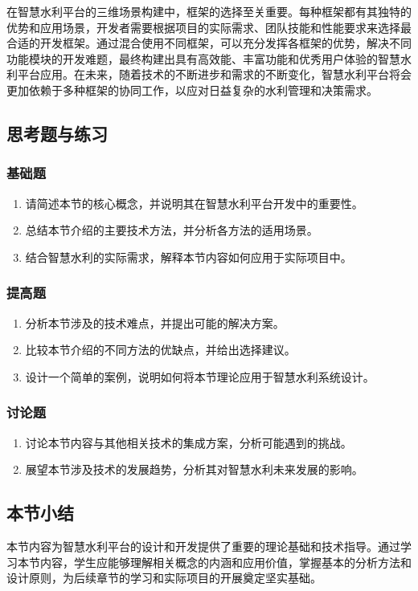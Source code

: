 在智慧水利平台的三维场景构建中，框架的选择至关重要。每种框架都有其独特的优势和应用场景，开发者需要根据项目的实际需求、团队技能和性能要求来选择最合适的开发框架。通过混合使用不同框架，可以充分发挥各框架的优势，解决不同功能模块的开发难题，最终构建出具有高效能、丰富功能和优秀用户体验的智慧水利平台应用。在未来，随着技术的不断进步和需求的不断变化，智慧水利平台将会更加依赖于多种框架的协同工作，以应对日益复杂的水利管理和决策需求。 \subsection{思考题与练习}\label{ux601dux8003ux9898ux4e0eux7ec3ux4e60} \subsubsection{基础题}\label{ux57faux7840ux9898} \begin{enumerate} \def\labelenumi{\arabic{enumi}.} \item 请简述本节的核心概念，并说明其在智慧水利平台开发中的重要性。 \item 总结本节介绍的主要技术方法，并分析各方法的适用场景。 \item 结合智慧水利的实际需求，解释本节内容如何应用于实际项目中。 \end{enumerate} \subsubsection{提高题}\label{ux63d0ux9ad8ux9898} \begin{enumerate} \def\labelenumi{\arabic{enumi}.} \setcounter{enumi}{3} \item 分析本节涉及的技术难点，并提出可能的解决方案。 \item 比较本节介绍的不同方法的优缺点，并给出选择建议。 \item 设计一个简单的案例，说明如何将本节理论应用于智慧水利系统设计。 \end{enumerate} \subsubsection{讨论题}\label{ux8ba8ux8bbaux9898} \begin{enumerate} \def\labelenumi{\arabic{enumi}.} \setcounter{enumi}{6} \item 讨论本节内容与其他相关技术的集成方案，分析可能遇到的挑战。 \item 展望本节涉及技术的发展趋势，分析其对智慧水利未来发展的影响。 \end{enumerate} \subsection{本节小结}\label{ux672cux8282ux5c0fux7ed3} 本节内容为智慧水利平台的设计和开发提供了重要的理论基础和技术指导。通过学习本节内容，学生应能够理解相关概念的内涵和应用价值，掌握基本的分析方法和设计原则，为后续章节的学习和实际项目的开展奠定坚实基础。

